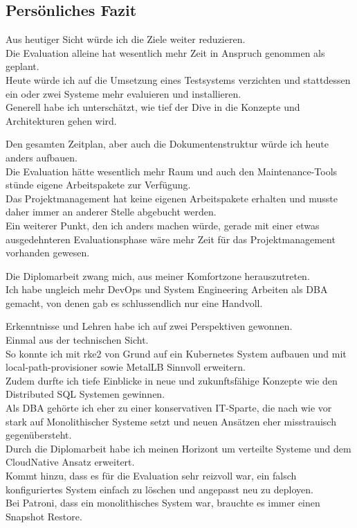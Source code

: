 
\begin{flushleft}
    \section{Persönliches Fazit}
    Aus heutiger Sicht würde ich die Ziele weiter reduzieren.\\
    Die Evaluation alleine hat wesentlich mehr Zeit in Anspruch genommen als geplant.\\
    Heute würde ich auf die Umsetzung eines Testsystems verzichten und stattdessen ein oder zwei Systeme mehr evaluieren und installieren.\\
    Generell habe ich unterschätzt, wie tief der Dive in die Konzepte und Architekturen gehen wird.
\end{flushleft}
\begin{flushleft}
    Den gesamten Zeitplan, aber auch die Dokumentenstruktur würde ich heute anders aufbauen.\\
    Die Evaluation hätte wesentlich mehr Raum und auch den Maintenance-Tools stünde eigene Arbeitspakete zur Verfügung.\\
    Das Projektmanagement hat keine eigenen Arbeitspakete erhalten und musste daher immer an anderer Stelle abgebucht werden.\\
    Ein weiterer Punkt, den ich anders machen würde, gerade mit einer etwas ausgedehnteren Evaluationsphase wäre mehr Zeit für das Projektmanagement vorhanden gewesen.
\end{flushleft}
\begin{flushleft}
    Die Diplomarbeit zwang mich, aus meiner Komfortzone herauszutreten.\\
    Ich habe ungleich mehr DevOps und System Engineering Arbeiten als DBA gemacht, von denen gab es schlussendlich nur eine Handvoll.
\end{flushleft}
\begin{flushleft}
    Erkenntnisse und Lehren habe ich auf zwei Perspektiven gewonnen.\\
    Einmal aus der technischen Sicht.\\
    So konnte ich mit \gls{rke2} von Grund auf ein \Gls{Kubernetes} System aufbauen und mit \gls{local-path-provisioner} sowie \Gls{MetalLB} Sinnvoll erweitern.\\
    Zudem durfte ich tiefe Einblicke in neue und zukunftsfähige Konzepte wie den Distributed SQL Systemen gewinnen.\\
    Als DBA gehörte ich eher zu einer konservativen IT-Sparte, die nach wie vor stark auf Monolithischer Systeme setzt und neuen Ansätzen eher misstrauisch gegenübersteht.\\
    Durch die Diplomarbeit habe ich meinen Horizont um verteilte Systeme und dem CloudNative Ansatz erweitert.\\
    Kommt hinzu, dass es für die Evaluation sehr reizvoll war, ein falsch konfiguriertes System einfach zu löschen und angepasst neu zu deployen.\\
    Bei Patroni, dass ein monolithisches System war, brauchte es immer einen Snapshot Restore.
\end{flushleft}
